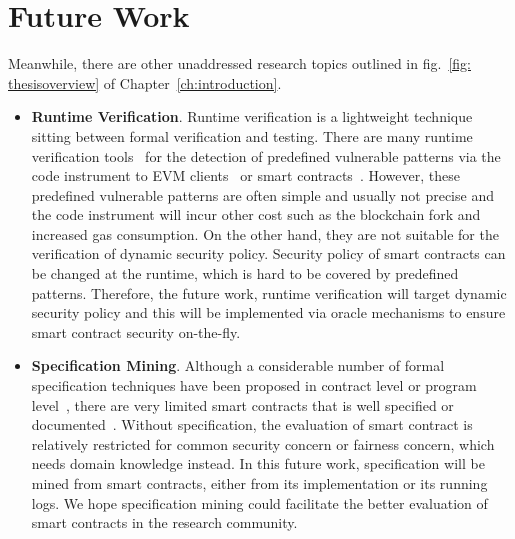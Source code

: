 \section{Future Work}
Meanwhile, there are other unaddressed research topics outlined in fig.~\ref{fig: thesisoverview} of Chapter~\ref{ch:introduction}.
\begin{itemize}
	\item \textbf{Runtime Verification}. Runtime verification is a lightweight technique sitting between formal verification and testing.
	There are many runtime verification tools~\cite{chen2020soda,akca2019solanalyser} for the detection of predefined vulnerable patterns via the code instrument to EVM clients~\cite{chen2020soda} or smart contracts~\cite{akca2019solanalyser}. 
	However, these predefined vulnerable patterns are often simple and usually not precise and the code instrument will incur other cost such as the blockchain fork and increased gas consumption.
	On the other hand, they are not suitable for the verification of dynamic security policy.
	Security policy of smart contracts can be changed at the runtime, which is hard to be covered by predefined patterns.
	Therefore, the future work, runtime verification will target dynamic security policy and this will be implemented via oracle mechanisms to ensure smart contract security on-the-fly.
	\item \textbf{Specification Mining}. 
	Although a considerable number of formal specification techniques have been proposed in contract level or program level~\cite{tolmach2020survey},
	there are very limited smart contracts that is well specified or documented~\cite{born2020formal, azure-workbench}.
	Without specification, the evaluation of smart contract is relatively restricted for common security concern or fairness concern, which needs domain knowledge instead.
	In this future work, specification will be mined from smart contracts, either from its implementation or its running logs.
	We hope specification mining could facilitate the better evaluation of smart contracts in the research community.
\end{itemize}